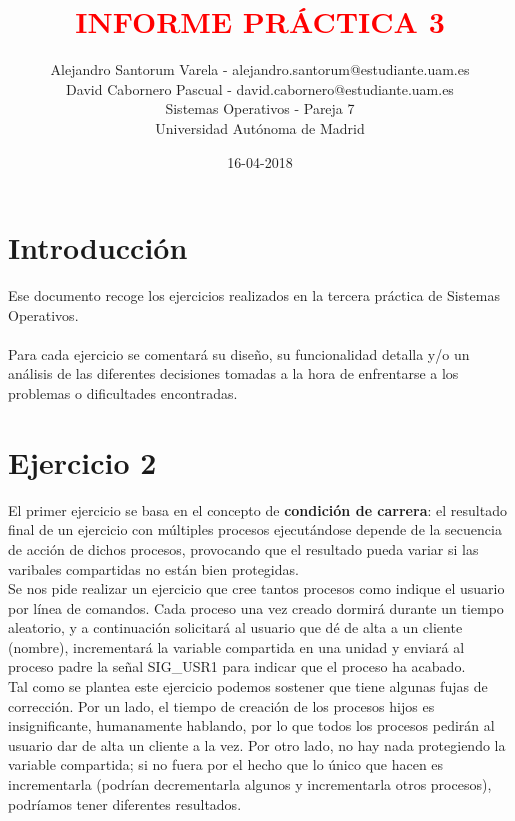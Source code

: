 \documentclass[12pt]{article}
\begin{document}
	\date{16-04-2018}
	
	
	\title{\textbf{\textcolor{red}{INFORME PRÁCTICA 3}}}
	\author{Alejandro Santorum Varela - alejandro.santorum@estudiante.uam.es\\David Cabornero Pascual - david.cabornero@estudiante.uam.es\\Sistemas Operativos - Pareja 7\\Universidad Autónoma de Madrid}
	\maketitle
	
	\tableofcontents
	
	\newpage
	
\section{Introducción}
Ese documento recoge los ejercicios realizados en la tercera práctica de Sistemas Operativos.\\\\
Para cada ejercicio se comentará su diseño, su funcionalidad detalla y/o un análisis de las diferentes decisiones tomadas a la hora de enfrentarse a los problemas o dificultades encontradas.\\

\section{Ejercicio 2}
El primer ejercicio se basa en el concepto de \textbf{condición de carrera}: el resultado final de un ejercicio con múltiples procesos ejecutándose depende de la secuencia de acción de dichos procesos, provocando que el resultado pueda variar si las varibales compartidas no están bien protegidas.\\

Se nos pide realizar un ejercicio que cree tantos procesos como indique el usuario por línea de comandos. Cada proceso una vez creado dormirá durante un tiempo aleatorio, y a continuación solicitará al usuario que dé de alta a un cliente (nombre), incrementará la variable compartida en una unidad y enviará al proceso padre la señal SIG\_USR1 para indicar que el proceso ha acabado.\\

Tal como se plantea este ejercicio podemos sostener que tiene algunas fujas de corrección. Por un lado, el tiempo de creación de los procesos hijos es insignificante, humanamente hablando, por lo que todos los procesos pedirán al usuario dar de alta un cliente a la vez. Por otro lado, no hay nada protegiendo la variable compartida; si no fuera por el hecho que lo único que hacen es incrementarla (podrían decrementarla algunos y incrementarla otros procesos), podríamos tener diferentes resultados.\\
\end{document}
